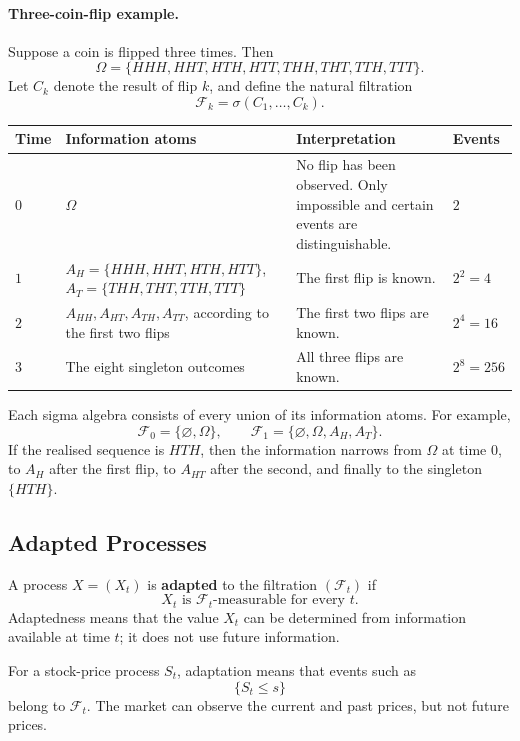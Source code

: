 \documentclass[12pt,openany]{book}
\theoremstyle{definition}
\theoremstyle{remark}
\begin{document}
\paragraph{Three-coin-flip example.}
Suppose a coin is flipped three times. Then
\[
\Omega
=\{HHH,HHT,HTH,HTT,THH,THT,TTH,TTT\}.
\]
Let \(C_k\) denote the result of flip \(k\), and define the natural
filtration
\[
\mathcal{F}_k=\sigma(C_1,\ldots,C_k).
\]

\begin{longtable}{@{}L{0.10\textwidth}L{0.35\textwidth}L{0.35\textwidth}L{0.09\textwidth}@{}}
\toprule
\textbf{Time} & \textbf{Information atoms} & \textbf{Interpretation} &
\textbf{Events} \\
\midrule
\(0\) & \(\Omega\) & No flip has been observed. Only impossible and certain
events are distinguishable. & \(2\) \\
\(1\) & \(A_H=\{HHH,HHT,HTH,HTT\}\),
\(A_T=\{THH,THT,TTH,TTT\}\) & The first flip is known. & \(2^2=4\) \\
\(2\) & \(A_{HH},A_{HT},A_{TH},A_{TT}\), according to the first two flips
& The first two flips are known. & \(2^4=16\) \\
\(3\) & The eight singleton outcomes & All three flips are known. &
\(2^8=256\) \\
\bottomrule
\end{longtable}

Each sigma algebra consists of every union of its information atoms. For
example,
\[
\mathcal{F}_0=\{\varnothing,\Omega\},
\qquad
\mathcal{F}_1=\{\varnothing,\Omega,A_H,A_T\}.
\]
If the realised sequence is \(HTH\), then the information narrows from
\(\Omega\) at time 0, to \(A_H\) after the first flip, to \(A_{HT}\) after
the second, and finally to the singleton \(\{HTH\}\).

\subsection{Adapted Processes}

A process \(X=(X_t)\) is \textbf{adapted} to the filtration
\((\mathcal{F}_t)\) if
\[
X_t\text{ is }\mathcal{F}_t\text{-measurable for every }t.
\]
Adaptedness means that the value \(X_t\) can be determined from information
available at time \(t\); it does not use future information.

For a stock-price process \(S_t\), adaptation means that events such as
\[
\{S_t\leq s\}
\]
belong to \(\mathcal{F}_t\). The market can observe the current and past
prices, but not future prices.
\end{document}
